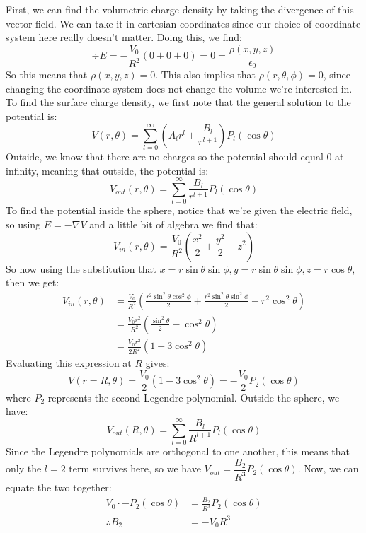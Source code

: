 \documentclass[10pt]{article}
\begin{document}
	\begin{solution}
		First, we can find the volumetric charge density by taking the divergence of this vector field. We can 
		take it in cartesian coordinates since our choice of coordinate system here really doesn't matter. Doing
		this, we find:
		\[
		\div E = -\frac{V_0}{R^2}\left( 0 + 0 + 0\right) = 0 = \frac{\rho(x, y, z)}{\epsilon_0}
		\] 
		So this means that $\rho(x, y, z) = 0$. This also implies that $\rho(r, \theta, \phi) = 0$, since 
		changing the coordinate system does not change the volume we're interested in. To find the surface
		charge density, we first note that the general solution to the potential is:
		\[
			V(r, \theta) = \sum_{l = 0}^\infty \left( A_l r^l + \frac{B_l}{r^{l+1}} \right) P_l(\cos \theta)
		\] 
		Outside, we know that there are no charges so the potential should equal 0 at infinity, meaning that 
		outside, the potential is: 
		\[
			V_{out}(r, \theta) = \sum_{l = 0}^\infty \frac{B_l}{r^{l+1}} P_l(\cos \theta)
		\]
		To find the potential inside the sphere, notice that we're given the electric field, so using $E = 
		-\nabla V$ and a little bit of algebra we find that:
		\[
			V_{in}(r, \theta) = \frac{V_0}{R^2}\left( \frac{x^2}{2} + \frac{y^2}{2} - z^2 \right) 
		\] 
		So now using the substitution that $x = r\sin \theta \sin \phi, y = r \sin \theta \sin \phi, z = r \cos
		\theta$, then we get:
		\begin{align*}
			V_{in}(r, \theta) &= \frac{V_0}{R^2}\left( \frac{r^2 \sin^2 \theta \cos^2 \phi}{2} + 
			\frac{r^2 \sin^2 \theta \sin^2 \phi}{2} - r^2 \cos^2 \theta \right)  \\
			&= \frac{V_0r^2}{R^2}\left( \frac{\sin^2 \theta}{2} - \cos^2 \theta \right)  \\
			&= \frac{V_0r^2}{2R^2}(1 - 3\cos^2 \theta)
		\end{align*}
		Evaluating this expression at $R$ gives:
		\[
		 V(r = R, \theta) = \frac{V_0}{2}(1 - 3 \cos^2 \theta) = -\frac{V_0}{2}P_2(\cos \theta)
		\] 
		where $P_2$ represents the second Legendre polynomial. Outside the sphere, we have: 
		\[
			V_{out} (R, \theta) = \sum_{l = 0}^\infty \frac{B_l}{R^{l+1}}P_l(\cos \theta)
		\] 
		Since the Legendre polynomials are orthogonal to one another, this means that only the $l =2$ term 
		survives here, so we have $V_{out} = \dfrac{B_2}{R^3}P_2(\cos \theta)$. Now, we can equate the two 
		together: 
		\begin{align*}
			V_0 \cdot -P_2(\cos \theta) &= \frac{B_2}{R^3}P_2(\cos \theta)\\
			\therefore B_2 &=  -V_0R^3

\end{align*}
\end{solution}
\end{document}
